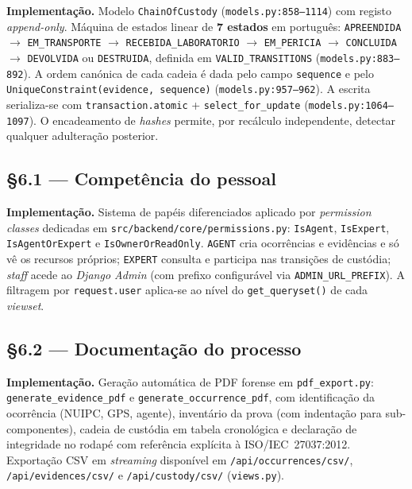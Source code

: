 \documentclass[a4paper,11pt]{article}
\begin{document}
\textbf{Implementação.} Modelo \texttt{ChainOfCustody}
(\texttt{models.py:858--1114}) com registo \emph{append-only}.
Máquina de estados linear de \textbf{7 estados} em português:
\texttt{APREENDIDA} $\rightarrow$ \texttt{EM\_TRANSPORTE} $\rightarrow$
\texttt{RECEBIDA\_LABORATORIO} $\rightarrow$ \texttt{EM\_PERICIA}
$\rightarrow$ \texttt{CONCLUIDA} $\rightarrow$ \texttt{DEVOLVIDA} ou
\texttt{DESTRUIDA}, definida em \texttt{VALID\_TRANSITIONS}
(\texttt{models.py:883--892}). A ordem canónica de cada cadeia é dada
pelo campo \texttt{sequence} e pelo \texttt{UniqueConstraint(evidence,
sequence)} (\texttt{models.py:957--962}). A escrita serializa-se com
\texttt{transaction.atomic} + \texttt{select\_for\_update}
(\texttt{models.py:1064--1097}). O encadeamento de \emph{hashes}
permite, por recálculo independente, detectar qualquer adulteração
posterior.

\subsection*{§6.1 --- Competência do pessoal}

\textbf{Implementação.} Sistema de papéis diferenciados aplicado por
\emph{permission classes} dedicadas em
\texttt{src/backend/core/permissions.py}: \texttt{IsAgent},
\texttt{IsExpert}, \texttt{IsAgentOrExpert} e
\texttt{IsOwnerOrReadOnly}. \texttt{AGENT} cria ocorrências e
evidências e só vê os recursos próprios; \texttt{EXPERT} consulta e
participa nas transições de custódia; \emph{staff} acede ao
\emph{Django Admin} (com prefixo configurável via
\texttt{ADMIN\_URL\_PREFIX}). A filtragem por
\texttt{request.user} aplica-se ao nível do \texttt{get\_queryset()}
de cada \emph{viewset}.

\subsection*{§6.2 --- Documentação do processo}

\textbf{Implementação.} Geração automática de PDF forense em
\texttt{pdf\_export.py}: \texttt{generate\_evidence\_pdf} e
\texttt{generate\_occurrence\_pdf}, com identificação da ocorrência
(NUIPC, GPS, agente), inventário da prova (com indentação para
sub-componentes), cadeia de custódia em tabela cronológica e
declaração de integridade no rodapé com referência explícita à
ISO/IEC~27037:2012. Exportação CSV em \emph{streaming} disponível em
\texttt{/api/occurrences/csv/}, \texttt{/api/evidences/csv/} e
\texttt{/api/custody/csv/} (\texttt{views.py}).
\end{document}
